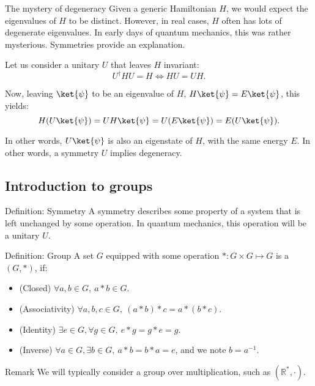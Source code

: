 \documentclass[a4paper]{article}
\begin{document}
\begin{parag}{The mystery of degeneracy}
    Given a generic Hamiltonian $H$, we would expect the eigenvalues of $H$ to be distinct. However, in real cases, $H$ often has lots of degenerate eigenvalues. In early days of quantum mechanics, this was rather mysterious. Symmetries provide an explanation.

    Let us consider a unitary $U$ that leaves $H$ invariant: 
    \[U^{\dagger} H U = H \iff HU = UH.\]

    Now, leaving $\ket{\psi}$ to be an eigenvalue of $H$, $H \ket{\psi} = E\ket{\psi}$, this yields: 
    \[H\left(U \ket{\psi}\right) = UH \ket{\psi} = U\left(E \ket{\psi}\right) = E \left(U \ket{\psi}\right).\]

    In other words, $U \ket{\psi}$ is also an eigenstate of $H$, with the same energy $E$. In other words, a symmetry $U$ implies degeneracy.
\end{parag}

\subsection{Introduction to groups}

\begin{parag}{Definition: Symmetry}
    A symmetry describes some property of a system that is left unchanged by some operation. In quantum mechanics, this operation will be a unitary $U$.
\end{parag}

\begin{parag}{Definition: Group}
    A set $G$ equipped with some operation $*: G \times G \mapsto G$ is a  $\left(G, *\right)$, if:
    \begin{itemize}
        \item (Closed) $\forall a, b \in G, \ a * b \in G.$
        \item (Associativity) $\forall a, b, c \in G, \ \left(a * b\right) * c = a* \left(b * c\right)$.
        \item (Identity) $\exists e \in G, \forall g \in G, \ e * g = g * e = g$.
        \item (Inverse) $\forall a \in G, \exists b \in G, \ a*b = b*a = e$, and we note $b = a^{-1}$.
    \end{itemize}

    \begin{subparag}{Remark}
        We will typically consider a group over multiplication, such as $\left(\mathbb{R}^*, \cdot\right)$.
    \end{subparag}
\end{parag}
\end{document}

